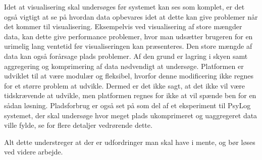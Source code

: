 Idet at visualisering skal undersøges før systemet kan ses som komplet, er det også vigtigt at se på hvordan data opbevares idet at dette kan give problemer når det kommer til visualisering. 
Eksempelvis ved visualisering af store mængder data, kan dette give performance problemer, hvor man udsætter brugeren for en urimelig lang ventetid før visualiseringen kan præsenteres. 
Den store mængde af data kan også forårsage plads problemer. 
Af den grund er lagring i skyen samt aggregering og komprimering af data nødvendigt at undersøge.
Platformen er udviklet til at være modulær og fleksibel, hvorfor denne modificering ikke regnes for et større problem at udvikle.
Dermed er det ikke sagt, at det ikke vil være tidskrævende at udvikle, men platformen regnes for ikke at vil spænde ben for en sådan løsning.
Pladsforbrug er også set på som del af et eksperiment til PsyLog systemet, der skal undersøge hvor meget plads ukomprimeret og uaggregeret data ville fylde, se \citet[Kapitel 4, Sektion 6]{misc:faellesrapp} for flere detaljer vedrørende dette.

Alt dette understreger at der er udfordringer man skal have i mente, og bør løses ved videre arbejde.